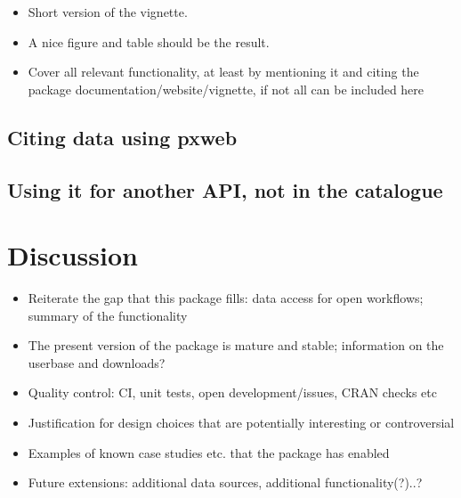 \begin{itemize}
    \item Short version of the vignette.
    \item A nice figure and table should be the result.
    \item Cover all relevant functionality, at least by mentioning it and citing the package documentation/website/vignette, if not all can be included here    
\end{itemize}


\subsection{Citing data using pxweb}

\subsection{Using it for another API, not in the catalogue}


\section[summary]{Discussion}

\begin{itemize}
    \item Reiterate the gap that this package fills: data access for open workflows; summary of the functionality
    \item The present version of the package is mature and stable; information on the userbase and downloads?
    \item Quality control: CI, unit tests, open development/issues, CRAN checks etc
    \item Justification for design choices that are potentially interesting or controversial
    \item Examples of known case studies etc. that the package has enabled
    \item Future extensions: additional data sources, additional functionality(?)..? 
\end{itemize}





